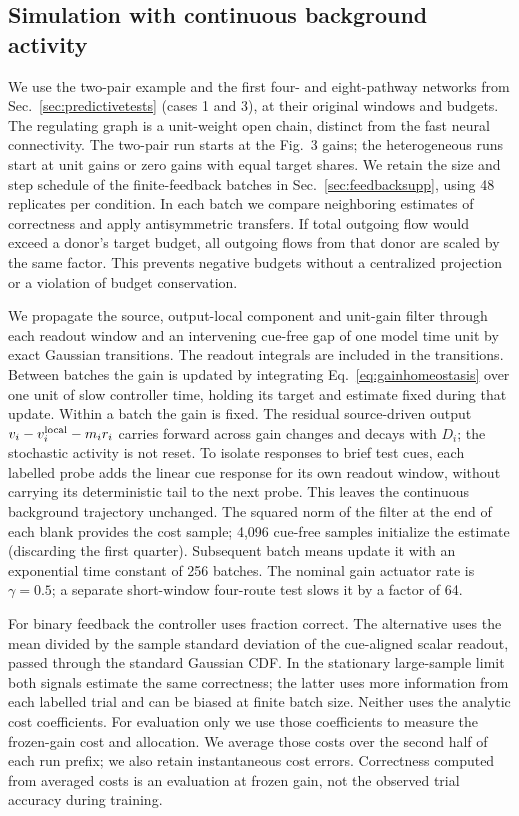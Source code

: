 \subsection{Simulation with continuous background activity}

We use the two-pair example and the first four- and eight-pathway
networks from Sec.~\ref{sec:predictivetests} (cases 1 and 3), at their
original windows and budgets. The regulating graph is a unit-weight
open chain, distinct from the fast neural connectivity. The two-pair
run starts at the Fig.~3 gains; the heterogeneous runs start at unit
gains or zero gains with equal target shares. We retain the size
and step schedule of the finite-feedback batches in
Sec.~\ref{sec:feedbacksupp}, using 48 replicates per condition.
In each batch we compare neighboring estimates of correctness and
apply antisymmetric transfers. If total outgoing flow would exceed
a donor's target budget, all outgoing flows from that donor are
scaled by the same factor. This prevents negative budgets without
a centralized projection or a violation of budget conservation.

We propagate the source, output-local component and unit-gain filter
through each readout window and an intervening cue-free gap of one
model time unit by exact Gaussian transitions. The readout integrals
are included in the transitions. Between batches the gain is updated
by integrating Eq.~\eqref{eq:gainhomeostasis} over one unit of slow
controller time, holding its target and estimate fixed during that
update. Within a batch the gain is fixed. The residual source-driven
output \(v_i-v_i^{\rm local}-m_i r_i\) carries forward across gain
changes and decays with \(D_i\); the stochastic activity is not reset.
To isolate responses to brief test cues, each labelled probe adds the
linear cue response for its own readout window, without carrying its
deterministic tail to the next probe. This leaves the continuous
background trajectory unchanged. The squared norm of the filter at
the end of each blank provides the cost sample; 4,096 cue-free samples
initialize the estimate (discarding the first quarter). Subsequent
batch means update it with an exponential time constant of 256
batches. The nominal gain actuator rate is \(\gamma=0.5\);
a separate short-window four-route test slows it by a factor of 64.

For binary feedback the controller uses fraction correct. The
alternative uses the mean divided by the sample standard deviation of
the cue-aligned scalar readout, passed through the standard Gaussian
CDF. In the stationary large-sample limit both signals estimate the
same correctness; the latter uses more information from each labelled
trial and can be biased at finite batch size. Neither uses the analytic
cost coefficients. For evaluation only we use those coefficients to
measure the frozen-gain cost and allocation. We average those costs
over the second half of each run prefix; we also retain instantaneous
cost errors. Correctness computed from averaged costs is an evaluation
at frozen gain, not the observed trial accuracy during training.

